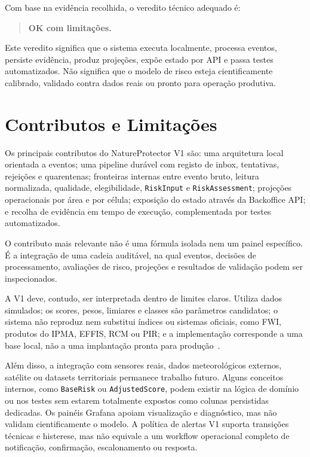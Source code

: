 Com base na evidência recolhida, o veredito técnico adequado é:

\begin{quote}
\textbf{OK com limitações.}
\end{quote}

Este veredito significa que o sistema executa localmente, processa eventos, persiste evidência, produz projeções, expõe estado por API e passa testes automatizados. Não significa que o modelo de risco esteja cientificamente calibrado, validado contra dados reais ou pronto para operação produtiva.

\section{Contributos e Limitações}

Os principais contributos do NatureProtector V1 são: uma arquitetura local orientada a eventos; uma pipeline durável com registo de inbox, tentativas, rejeições e quarentenas; fronteiras internas entre evento bruto, leitura normalizada, qualidade, elegibilidade, \texttt{RiskInput} e \texttt{RiskAssessment}; projeções operacionais por área e por célula; exposição do estado através da Backoffice API; e recolha de evidência em tempo de execução, complementada por testes automatizados.

O contributo mais relevante não é uma fórmula isolada nem um painel específico. É a integração de uma cadeia auditável, na qual eventos, decisões de processamento, avaliações de risco, projeções e resultados de validação podem ser inspecionados.

A V1 deve, contudo, ser interpretada dentro de limites claros. Utiliza dados simulados; os scores, pesos, limiares e classes são parâmetros candidatos; o sistema não reproduz nem substitui índices ou sistemas oficiais, como FWI, produtos do IPMA, EFFIS, RCM ou PIR; e a implementação corresponde a uma base local, não a uma implantação pronta para produção~\citep{nrcan_fwi_system,ipma_fwi,ipma_pir_rcm,copernicus_effis}.

Além disso, a integração com sensores reais, dados meteorológicos externos, satélite ou datasets territoriais permanece trabalho futuro. Alguns conceitos internos, como \texttt{BaseRisk} ou \texttt{AdjustedScore}, podem existir na lógica de domínio ou nos testes sem estarem totalmente expostos como colunas persistidas dedicadas. Os painéis Grafana apoiam visualização e diagnóstico, mas não validam cientificamente o modelo. A política de alertas V1 suporta transições técnicas e histerese, mas não equivale a um workflow operacional completo de notificação, confirmação, escalonamento ou resposta.

